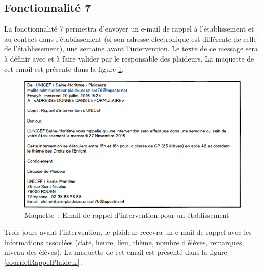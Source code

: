 \subsection{Fonctionnalité 7}
La fonctionnalité 7 permettra d'envoyer un e-mail de rappel à l'établissement et au contact dans l'établissement (si son adresse électronique est différente de celle de l'établissement), une semaine avant l'intervention. Le texte de ce message sera à définir avec \nomClient{} et à faire valider par le responsable des plaideurs. La maquette de cet email est présenté dans la figure \ref{courrielRappelEtablissement}. \\

\begin{figure}[H]
	\centering
	\includegraphics[scale=0.675]{images/maquettes/fonctionnalite7MailDeRappelPourLEtablissement.png}
	\caption{Maquette~: Email de rappel d'intervention pour un établissement}
	\label{courrielRappelEtablissement}
\end{figure}

Trois jours avant l'intervention, le plaideur recevra un e-mail de rappel avec les informations associées (date, heure, lieu, thème, nombre d'élèves, remarques, niveau des élèves). 
La maquette de cet email est présenté dans la figure \ref{courrielRappelPlaideur}. \\
\\


